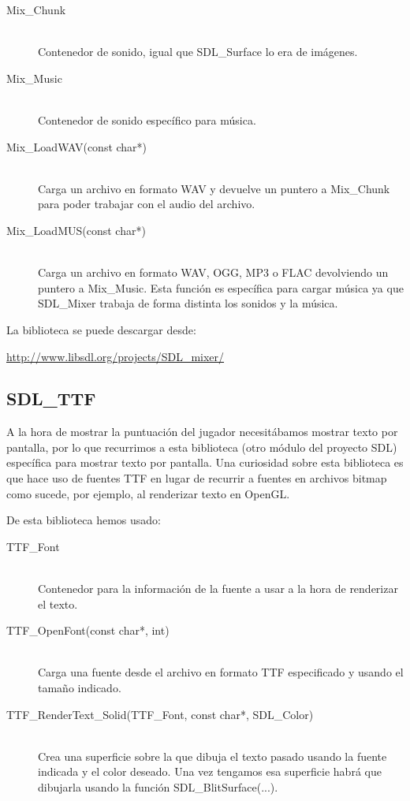 \documentclass[parskip=half*]{scrartcl}
\begin{document}
	\begin{description}
		\item[Mix\_Chunk] \hfill \\	Contenedor de sonido, igual que SDL\_Surface lo era de im\'agenes.

		\item[Mix\_Music] \hfill \\ Contenedor de sonido espec\'ifico para m\'usica.

		\item[Mix\_LoadWAV(const char*)] \hfill \\	Carga un archivo en formato WAV y devuelve un puntero a Mix\_Chunk para poder trabajar con el audio del archivo.

		\item[Mix\_LoadMUS(const char*)] \hfill \\	Carga un archivo en formato WAV, OGG, MP3 o FLAC devolviendo un puntero a Mix\_Music. Esta funci\'on es espec\'ifica para cargar m\'usica ya que SDL\_Mixer trabaja de forma distinta los sonidos y la m\'usica.
	\end{description}

	La biblioteca se puede descargar desde: \\

	\centerline{\url{http://www.libsdl.org/projects/SDL_mixer/}}

	\subsection{SDL\_TTF}
	A la hora de mostrar la puntuaci\'on del jugador necesit\'abamos mostrar texto por pantalla, por lo que recurrimos a esta biblioteca (otro m\'odulo del proyecto SDL) espec\'ifica para mostrar texto por pantalla. Una curiosidad sobre esta biblioteca es que hace uso de fuentes TTF en lugar de recurrir a fuentes en archivos bitmap como sucede, por ejemplo, al renderizar texto en OpenGL.

	De esta biblioteca hemos usado:

	\begin{description}
		\item[TTF\_Font] \hfill \\	Contenedor para la informaci\'on de la fuente a usar a la hora de renderizar el texto.

		\item[TTF\_OpenFont(const char*, int)] \hfill \\ Carga una fuente desde el archivo en formato TTF especificado y usando el tamaño indicado.

		\item[TTF\_RenderText\_Solid(TTF\_Font, const char*, SDL\_Color)] \hfill \\ Crea una superficie sobre la que dibuja el texto pasado usando la fuente indicada y el color deseado. Una vez tengamos esa superficie habr\'a que dibujarla usando la funci\'on SDL\_BlitSurface(...). 
	\end{description}
\end{document}
